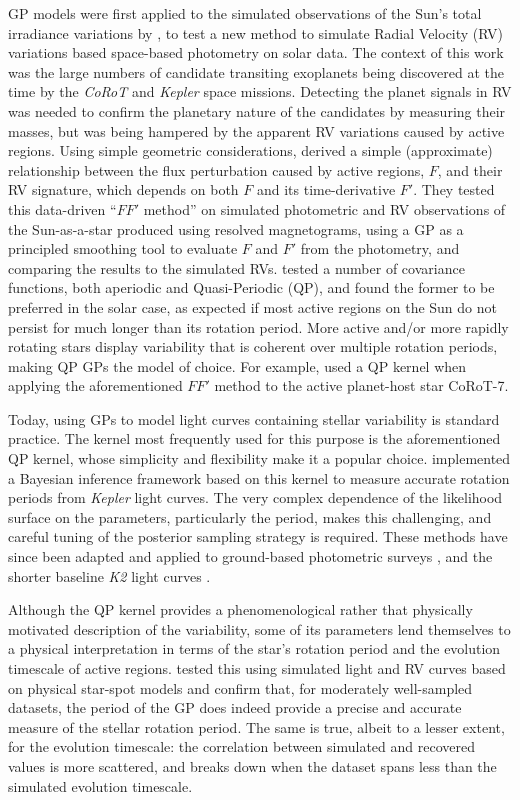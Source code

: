 \documentclass[letterpaper]{ar-1col}
\begin{document}
GP models were first applied to the simulated observations of the Sun's total irradiance variations by \citet{2012MNRAS.419.3147A}, to test a new method to simulate Radial Velocity (RV) variations based space-based photometry on solar data. The context of this work was the large numbers of candidate transiting exoplanets being discovered at the time by the \textit{CoRoT} and \textit{Kepler} space missions. Detecting the planet signals in RV was needed to confirm the planetary nature of the candidates by measuring their masses, but was being hampered by the apparent RV variations caused by active regions. Using simple geometric considerations, \citet{2012MNRAS.419.3147A} derived a simple (approximate) relationship between the flux perturbation caused by active regions, $F$, and their RV signature, which depends on both $F$ and its time-derivative $F'$. They tested this data-driven ``$FF'$ method'' on simulated photometric and RV observations of the Sun-as-a-star produced using resolved magnetograms, using a GP as a principled smoothing tool to evaluate $F$ and $F'$ from the photometry, and comparing the results to the simulated RVs. \citet{2012MNRAS.419.3147A}  tested a number of covariance functions, both aperiodic and Quasi-Periodic (QP), and found the former to be preferred in the solar case, as expected if most active regions on the Sun do not persist for much longer than its rotation period. More active and/or more rapidly rotating stars display variability that is coherent over multiple rotation periods, making QP GPs the model of choice. For example, \citet{2014MNRAS.443.2517H} used a QP kernel when applying the aforementioned $FF'$ method to the active planet-host star CoRoT-7.

Today, using GPs to model light curves containing stellar variability is standard practice. The kernel most frequently used for this purpose is the aforementioned QP kernel, whose simplicity and flexibility make it a popular choice. \citet{2018MNRAS.474.2094A} implemented a Bayesian inference framework based on this kernel to measure accurate rotation periods from \textit{Kepler} light curves. The very complex dependence of the likelihood surface on the parameters, particularly the period, makes this challenging, and careful tuning of the posterior sampling strategy is required.
These methods have since been adapted and applied to ground-based photometric surveys \citep{2020MNRAS.492.1008G}, and the shorter baseline \textit{K2} light curves \citep{2021ApJ...913...70G}.

Although the QP kernel provides a phenomenological rather that physically motivated description of the variability, some of its parameters lend themselves to a physical interpretation in terms of the star's rotation period and the evolution timescale of active regions. \citet{2022MNRAS.tmp.2007N} tested this using simulated light and RV curves based on physical star-spot models and confirm that, for moderately well-sampled datasets, the period of the GP does indeed provide a precise and accurate measure of the stellar rotation period. The same is true, albeit to a lesser extent, for the evolution timescale: the correlation between simulated and recovered values is more scattered, and breaks down when the dataset spans less than the simulated evolution timescale.
\end{document}
